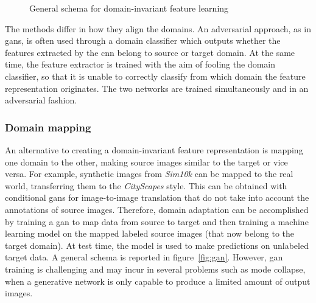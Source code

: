 \documentclass[%
    corpo=12pt,
    twoside,
    stile=classica,   
    tipotesi=magistrale,
    evenboxes,
    english
]{toptesi}
\begin{document}
\begin{figure}[ht]
	\centering
	\caption{General schema for domain-invariant feature learning\cite{wilson2020survey}}
	\label{fig:align}
\end{figure}

The methods differ in how they align the domains. An adversarial approach, as in \glspl{gan}, is often used through a domain classifier which outputs whether the features extracted by the \gls{cnn} belong to source or target domain. At the same time, the feature extractor is trained with the aim of fooling the domain classifier, so that it is unable to correctly classify from which domain the feature representation originates. The two networks are trained simultaneously and in an adversarial fashion.

\subsubsection{Domain mapping}
An alternative to creating a domain-invariant feature representation is mapping one domain to the other, making source images similar to the target or vice versa. For example, synthetic images from \textit{Sim10k} can be mapped to the real world, transferring them to the \textit{CityScapes} style. This can be obtained with conditional \glspl{gan} for image-to-image translation that do not take into account the annotations of source images. Therefore, domain adaptation can be accomplished by training a \gls{gan} to map data from source to target and then training a machine learning model on the mapped labeled source images (that now belong to the target domain). At test time, the model is used to make predictions on unlabeled target data. A general schema is reported in figure~\ref{fig:gan}. However, \gls{gan} training is challenging and may incur in several problems such as mode collapse, when a generative network is only capable to produce a limited amount of output images.
\end{document}
